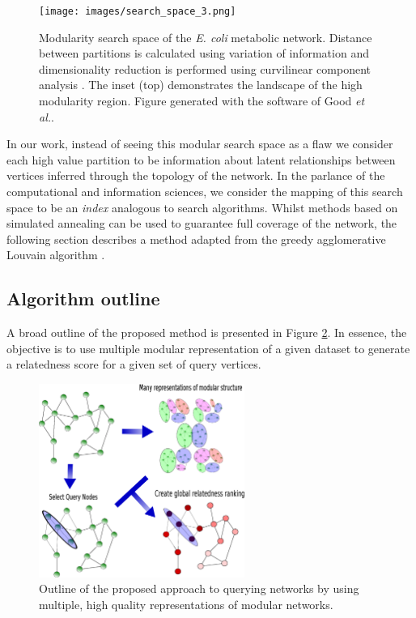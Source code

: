 \documentclass[a4paper,10pt]{article}
\begin{document}
\begin{figure}
\centering
 \texttt{[image: images/search\_space\_3.png]}
 \caption{
 Modularity search space of the \textit{E. coli} metabolic network.
 Distance between partitions is calculated using variation of information \cite{meilua2003comparing} and dimensionality reduction is performed using curvilinear component analysis \cite{demartines1997curvilinear}.
  The inset (top) demonstrates the landscape of the high modularity region. 
  Figure generated with the software of Good \textit{et al.}\cite{good2010performance}.
 }
 \label{fig:modular_search_space}
\end{figure}

In our work, instead of seeing this modular search space as a flaw we consider each high value partition to be information about latent relationships between vertices inferred through the topology of the network.
In the parlance of the computational and information sciences, we consider the mapping of this search space to be an \textit{index} analogous to search algorithms.
Whilst methods based on simulated annealing can be used to guarantee full coverage of the network, the following section describes a method adapted from the greedy agglomerative Louvain algorithm \cite{blondel2008fast}.

\subsection{Algorithm outline}
A broad outline of the proposed method is presented in Figure \ref{fig:algorithm_outline}.
In essence, the objective is to use multiple modular representation of a given dataset to generate a relatedness score for a given set of query vertices.

\begin{figure}
 \centering
 \includegraphics[width=0.6\textwidth]{images/meth_fig/fig1_desc.eps}
 \caption{Outline of the proposed approach to querying networks by using multiple, high quality representations of modular networks.}
 \label{fig:algorithm_outline}
\end{figure}
\end{document}
